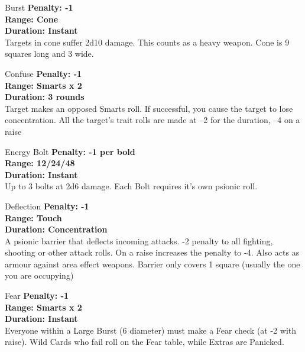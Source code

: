 \begin{multicols}{2}
\begin{genericsection}{Burst}
\textbf{Penalty: -1}\\
\textbf{Range: Cone}\\
\textbf{Duration: Instant}\\
Targets in cone suffer 2d10 damage. This counts as a heavy weapon. Cone is 9 squares long and 3 wide.\\
\end{genericsection}

\begin{genericsection}{Confuse}
\textbf{Penalty: -1}\\
\textbf{Range: Smarts x 2}\\
\textbf{Duration: 3 rounds}\\
Target makes an opposed Smarts roll. If successful, you cause the target to lose concentration. All the target’s trait rolls are made at –2 for the duration, –4 on a raise\\
\end{genericsection}

\begin{genericsection}{Energy Bolt}
\textbf{Penalty: -1 per bold}\\
\textbf{Range: 12/24/48}\\
\textbf{Duration: Instant}\\
Up to 3 bolts at 2d6 damage. Each Bolt requires it's own psionic roll.\\
\end{genericsection}

\begin{genericsection}{Deflection}
\textbf{Penalty: -1}\\
\textbf{Range: Touch}\\
\textbf{Duration: Concentration}\\
A psionic barrier that deflects incoming attacks. -2 penalty to all fighting, shooting or other attack rolls. On a raise increases the penalty to -4. Also acts as armour against area effect weapons. Barrier only covers 1 square (usually the one you are occupying)
\end{genericsection}

\begin{genericsection}{Fear}
\textbf{Penalty: -1}\\
\textbf{Range: Smarts x 2}\\
\textbf{Duration: Instant}\\
Everyone within a Large Burst (6 diameter) must make a Fear check (at -2 with raise). Wild Cards who fail roll on the Fear table, while Extras are Panicked.
\end{genericsection}


\end{multicols}
